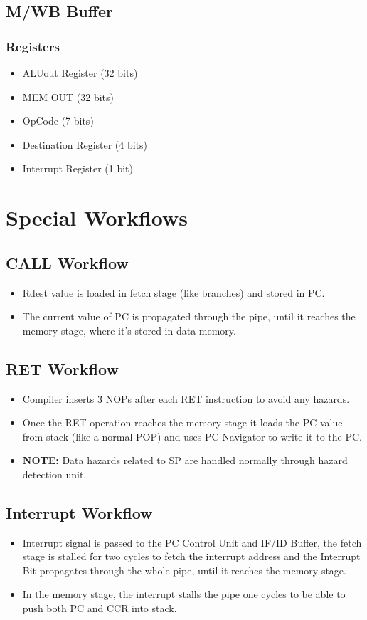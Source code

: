 \subsection{M/WB Buffer}

\subsubsection{Registers}
\begin{itemize}
    \item ALUout Register (32 bits)
    \item MEM OUT (32 bits)
    \item OpCode (7 bits)
    \item Destination Register (4 bits)
    \item Interrupt Register (1 bit)
\end{itemize}


\section{Special Workflows}

\subsection{CALL Workflow}
\begin{itemize}
    \item Rdest value is loaded in fetch stage (like branches) and stored in PC.
    \item The current value of PC is propagated through the pipe, until it reaches the memory stage, where it's stored in data memory.
\end{itemize}

\subsection{RET Workflow}
\begin{itemize}
    \item Compiler inserts 3 NOPs after each RET instruction to avoid any hazards.
    \item Once the RET operation reaches the memory stage it loads the PC value from stack (like a normal POP) and uses PC Navigator to write it to the PC.
    \item \textbf{NOTE:} Data hazards related to SP are handled normally through hazard detection unit.
\end{itemize}

\subsection{Interrupt Workflow}
\begin{itemize}
    \item Interrupt signal is passed to the PC Control Unit and IF/ID Buffer, the fetch stage is stalled for two cycles to fetch the interrupt address and the Interrupt Bit propagates through the whole pipe, until it reaches the memory stage.
    \item In the memory stage, the interrupt stalls the pipe one cycles to be able to push both PC and CCR into stack.
\end{itemize}

